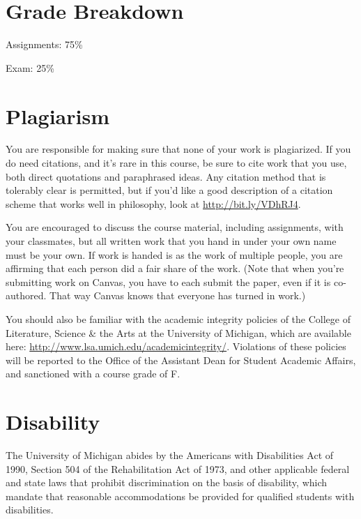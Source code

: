 \documentclass[10pt]{article}
\begin{document}
\section*{Grade Breakdown}

\begin{itemize*}
\item Assignments: 75\%
\item Exam: 25\% 
\end{itemize*}


\newpage
\section*{Plagiarism}

\noindent  You are responsible for making sure that none of your work is plagiarized. If you do need citations, and it's rare in this course, be sure to cite work that you use, both direct quotations and paraphrased ideas. Any citation method that is tolerably clear is permitted, but if you'd like a good description of a citation scheme that works well in philosophy, look at \url{http://bit.ly/VDhRJ4}.\smallskip

You are encouraged to discuss the course material, including assignments, with your classmates, but all written work that you hand in under your own name must be your own. If work is handed is as the work of multiple people, you are affirming that each person did a fair share of the work. (Note that when you're submitting work on Canvas, you have to each submit the paper, even if it is co-authored. That way Canvas knows that everyone has turned in work.)\smallskip

You should also be familiar with the academic integrity policies of the College of Literature, Science \& the Arts at the University of Michigan, which are available here: \url{http://www.lsa.umich.edu/academicintegrity/}. Violations of these policies will be reported to the Office of the Assistant Dean for Student Academic Affairs, and sanctioned with a course grade of F.

\section*{Disability}

\noindent  The University of Michigan abides by the Americans with Disabilities Act of 1990, Section 504 of the Rehabilitation Act of 1973, and other applicable federal and state laws that prohibit discrimination on the basis of disability, which mandate that reasonable accommodations be provided for qualified students with disabilities. \smallskip
\end{document}
